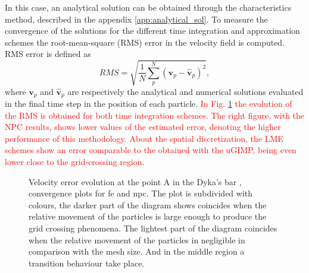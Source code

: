 \documentclass[preprint,12pt,a4paper]{elsarticle}
\newcommand{\vect}[1]{
  \ensuremath{\mathbf{{#1}}}
}
\newcommand{\PNA}[1]{
  \textcolor{red}{{#1}}
}
\begin{document}
In this case, an analytical solution can be obtained
through the characteristics method, described in the appendix
\ref{app:analytical_sol}. To measure the convergence of the solutions
for the different time integration and approximation schemes the
root-mean-square (RMS) error in the velocity field is computed. RMS
error is defined as
\begin{equation}
  \label{eq:RMS}
  RMS = \sqrt{\frac{1}{N} \sum^{N}_p \left( \vect{v}_p - \hat{\vect{v}}_p \right)^2},
\end{equation}
where $\vect{v}_p$ and $\hat{\vect{v}}_p$ are respectively the analytical and
numerical solutions evaluated in the final time step in the position
of each particle. \PNA{In Fig. \ref{fig:Dyka-error-evol} the evolution of the RMS is obtained for both time integration schemes. The right figure, with the \acrshort{NPC} results, shows lower values of the estimated error, denoting the higher performance of this methodology. About the spatial discretization, the \acrshort{LME} schemes show an error comparable to the obtained with the \acrshort{uGIMP}, being even lower close to the grid-crossing region.}

\begin{figure}\sidecaption
  \centering
  \caption{Velocity error evolution at the point A in the Dyka's bar ,
    convergence plots for \acrshort{fe} and \acrshort{npc}. The plot is subdivided with
    colours, the darker part of the diagram shows coincides when the
    relative movement of the particles is large enough to produce the
    grid crossing phenomena. The lightest part of the diagram
    coincides when the relative movement of the particles in
    negligible in comparison with the mesh size. And in the middle
    region a transition behaviour take place.}
  \label{fig:Dyka-error-evol}
\end{figure}
\end{document}
